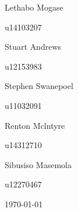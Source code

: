 \documentclass[hidelinks,a4paper,12pt]{article}
\begin{document}
\begin{titlepage}
\begin{center}
			\begin{minipage}{0.4\textwidth}
				\begin{flushleft} \large
					Lethabo {Mogase}
				\end{flushleft}
			\end{minipage}
			\begin{minipage}{0.4\textwidth}
				\begin{flushright} \large
					\emph{}
					u14103207
				\end{flushright}
			\end{minipage}
			
			\begin{minipage}{0.4\textwidth}
				\begin{flushleft} \large
					Stuart {Andrews}
				\end{flushleft}
			\end{minipage}
			\begin{minipage}{0.4\textwidth}
				\begin{flushright} \large
					\emph{}
					u12153983
				\end{flushright}
			\end{minipage}
			
			\begin{minipage}{0.4\textwidth}
				\begin{flushleft} \large
					Stephen {Swanepoel}
				\end{flushleft}
			\end{minipage}
			\begin{minipage}{0.4\textwidth}
				\begin{flushright} \large
					\emph{}
					u11032091
				\end{flushright}
			\end{minipage}
			
			\begin{minipage}{0.4\textwidth}
				\begin{flushleft} \large
					Renton {Mclntyre}
				\end{flushleft}
				\end{minipage}
				\begin{minipage}{0.4\textwidth}
				\begin{flushright} \large
				\emph{}
				u14312710
				\end{flushright}
			\end{minipage}
			
			\begin{minipage}{0.4\textwidth}
				\begin{flushleft} \large
					Sibusiso {Masemola}
				\end{flushleft}
			\end{minipage}
			\begin{minipage}{0.4\textwidth}
				\begin{flushright} \large
					\emph{}
					u12270467
				\end{flushright}
			\end{minipage}

			
			\vfill
			{\large \today}
		\end{center}
	\end{titlepage}
\end{document}

